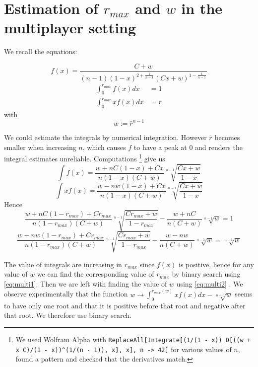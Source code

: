 \documentclass[preprint,12pt,authoryear]{elsarticle}
\theoremstyle{definition}
\begin{document}
\section{\texorpdfstring{Estimation of ${r_{max}}$ and $w$ in the multiplayer setting}{Estimation of rmax and w in the multiplayer setting}}
\label{estimate}

We recall the equations:

$$f(x) = \frac{C + w}{(n-1)(1-x)^{2+\frac{1}{n-1}} (C x + w)^{1 - \frac{1}{n-1}}}$$
\begin{align*}
        \int_0^{r_{max}} f(x) dx &= 1 \\
        \int_0^{r_{max}} x f(x) dx &= \bar r 
\end{align*}
with $$w := \bar r ^ {n-1}$$

We could estimate the integrals by numerical integration. However $\bar r$ becomes smaller when increasing $n$, which causes $f$ to have a peak at $0$ and renders the integral estimates unreliable.
Computations \footnote{We used Wolfram Alpha with \texttt{ReplaceAll[Integrate[(1/(1 - x)) D[((w + x C)/(1 - x))\^{}(1/(n - 1)), x], x], {n -> 42}]} for various values of $n$, found a pattern and checked that the derivatives match.} give us 
$$\int f(x) = \frac{w + nC(1-x) + Cx}{n (1 - x)(C+w)} \sqrt[n-1]{\frac{Cx + w}{1-x}}$$
$$\int x f(x) = \frac{w - n w  (1-x) + Cx}{n (1-x)(C+w)}\sqrt[n-1]{\frac{Cx+w}{1-x}}$$
Hence
\begin{equation}
\label{eq:multi1}
\frac{w + nC(1-{r_{max}}) + C{r_{max}}}{n (1 - {r_{max}})(C+w)} \sqrt[n-1]{\frac{C{r_{max}} + w}{1-{r_{max}}}} -  \frac{w + nC}{n (C+w)} \sqrt[n-1]{w} = 1
\end{equation}
\begin{equation}
\label{eq:multi2}
\frac{w - n w  (1-{r_{max}}) + C{r_{max}}}{n (1-{r_{max}})(C+w)}\sqrt[n-1]{\frac{C{r_{max}}+w}{1-{r_{max}}}} - \frac{w - n w}{n (C+w)}\sqrt[n-1]{w} = \sqrt[n-1]{w}
\end{equation}

The value of integrals are increasing in ${r_{max}}$ since $f(x)$ is positive, hence for any value of $w$ we can find the corresponding value of ${r_{max}}$ by binary search using \eqref{eq:multi1}. Then we are left with finding the value of $w$ using \eqref{eq:multi2} . We observe experimentally that the function $w \rightarrow \int_0^{{r_{max}}(w)}xf(x)dx - \sqrt[n-1]{w}$ seems to have only one root and that it is positive before that root and negative after that root. We therefore use binary search.
\end{document}
